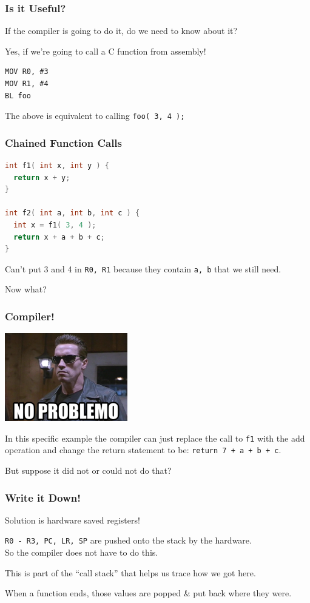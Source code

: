 \begin{frame}[fragile]
\frametitle{Is it Useful?}

If the compiler is going to do it, do we need to know about it?

Yes, if we're going to call a C function from assembly!

\begin{verbatim}
MOV R0, #3
MOV R1, #4
BL foo
\end{verbatim}

The above is equivalent to calling \texttt{foo( 3, 4 );}

\end{frame}


\begin{frame}[fragile]
\frametitle{Chained Function Calls}

\begin{lstlisting}[language=C]
int f1( int x, int y ) {
  return x + y;
}

int f2( int a, int b, int c ) {
  int x = f1( 3, 4 );
  return x + a + b + c;
}
\end{lstlisting}


Can't put 3 and 4 in \texttt{R0, R1} because they contain \texttt{a, b} that we still need.

Now what? 

\end{frame}


\begin{frame}
\frametitle{Compiler!}

\begin{center}
	\includegraphics[width=0.4\textwidth]{images/NoProblemo.png}
\end{center}

In this specific example the compiler can just replace the call to \texttt{f1} with the add operation and change the return statement to be: \texttt{return 7 + a + b + c}.

But suppose it did not or could not do that?

\end{frame}


\begin{frame}
\frametitle{Write it Down!}

Solution is hardware saved registers!

\texttt{R0 - R3, PC, LR, SP} are pushed onto the stack by the hardware.\\
\quad So the compiler does not have to do this.

This is part of the ``call stack'' that helps us trace how we got here.

When a function ends, those values are popped \& put back where they were.
\end{frame}



